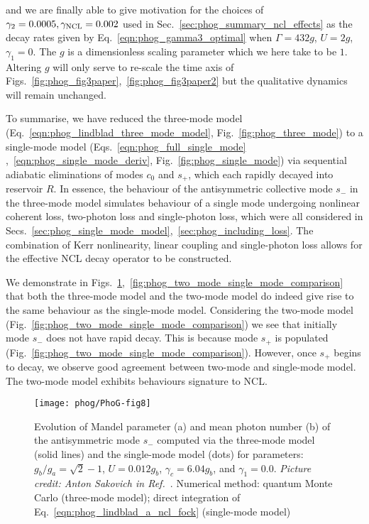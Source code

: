 \noindent and we are finally able to give motivation for the choices of $\gamma_2=0.0005, \gamma_{\text{NCL}}=0.002$ used in Sec.~\ref{sec:phog_summary_ncl_effects} as the decay rates given by Eq.~\ref{eqn:phog_gamma3_optimal} when $\Gamma = 432 g$, $U = 2 g$, $\gamma_1 = 0$. The $g$ is a dimensionless scaling parameter which we here take to be $1$. Altering $g$ will only serve to re-scale the time axis of Figs.~\ref{fig:phog_fig3paper},~\ref{fig:phog_fig3paper2} but the qualitative dynamics will remain unchanged. 

To summarise, we have reduced the three-mode model (Eq.~\ref{eqn:phog_lindblad_three_mode_model}, Fig.~\ref{fig:phog_three_mode}) to a single-mode model (Eqs.~\ref{eqn:phog_full_single_mode}
,~\ref{eqn:phog_single_mode_deriv}, Fig.~\ref{fig:phog_single_mode}) via sequential adiabatic eliminations of modes $c_0$ and $s_+$, which each rapidly decayed into reservoir $R$. In essence, the behaviour of the antisymmetric collective mode $s_-$ in the three-mode model simulates behaviour of a single mode undergoing nonlinear coherent loss, two-photon loss and single-photon loss, which were all considered in Secs.~\ref{sec:phog_single_mode_model},~\ref{sec:phog_including_loss}. The combination of Kerr nonlinearity, linear coupling and single-photon loss allows for the effective NCL decay operator to be constructed.

We demonstrate in Figs.~\ref{fig:phog_three_mode_single_mode_comparison},~\ref{fig:phog_two_mode_single_mode_comparison} that both the three-mode model and the two-mode model do  indeed give rise to the same behaviour as the single-mode model. Considering the two-mode model (Fig.~\ref{fig:phog_two_mode_single_mode_comparison}) we see that initially mode $s_-$ does not have rapid decay. This is because mode $s_+$ is populated (Fig.~\ref{fig:phog_two_mode_single_mode_comparison}). However, once $s_+$ begins to decay, we observe good agreement between two-mode and single-mode model. The two-mode model exhibits behaviours signature to NCL.


\begin{figure}[htp]
\captionsetup{width=\linewidth}
\centering
\texttt{[image: phog/PhoG-fig8]}
\caption{\label{fig:phog_three_mode_single_mode_comparison}
Evolution of Mandel parameter (a) and mean photon number (b) of the antisymmetric mode $s_-$ computed via the three-mode model (solid lines) and the single-mode model (dots) for parameters: $g_b / g_a = \sqrt{2} - 1$, $U = 0.012 g_b$, $\gamma_c = 6.04 g_b$, and $\gamma_1 = 0.0$. \emph{Picture credit: Anton Sakovich in Ref.~\cite{Thornton2019a}}. Numerical method: quantum Monte Carlo (three-mode model); direct integration of Eq.~\ref{eqn:phog_lindblad_a_ncl_fock} (single-mode model)}
\end{figure}

